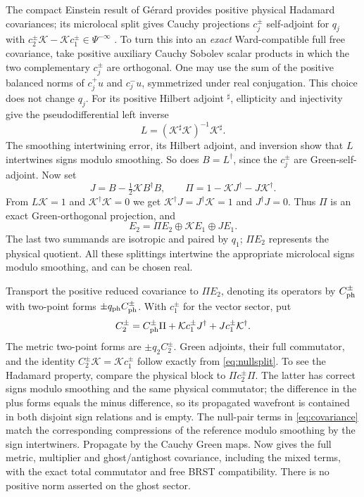 The compact Einstein result of G\'erard provides positive physical Hadamard covariances; its microlocal split gives Cauchy projections \(c_j^\pm\) self-adjoint for \(q_j\) with
\(
 c_2^\pm\mathcal K-\mathcal K c_1^\pm\in\Psi^{-\infty}
\)
\cite[Thm.~1.1, Lemma~3.2]{Gerard}. To turn this into an \emph{exact} Ward-compatible full free covariance, take positive auxiliary Cauchy Sobolev scalar products in which the two complementary \(c_j^\pm\) are orthogonal. One may use the sum of the positive balanced norms of \(c_j^+u\) and \(c_j^-u\), symmetrized under real conjugation. This choice does not change \(q_j\). For its positive Hilbert adjoint \(^{\sharp}\), ellipticity and injectivity give the pseudodifferential left inverse
\[
 L=(\mathcal K^\sharp\mathcal K)^{-1}\mathcal K^\sharp .
\]
The smoothing intertwining error, its Hilbert adjoint, and inversion show that \(L\) intertwines signs modulo smoothing. So does \(B=L^\dagger\), since the \(c_j^\pm\) are Green-self-adjoint. Now set
\begin{equation}
 J=B-\tfrac12\mathcal K B^\dagger B,\qquad
 \Pi=1-\mathcal K J^\dagger-J\mathcal K^\dagger .
 \label{eq:nullsplit}
\end{equation}
From \(L\mathcal K=1\) and \(\mathcal K^\dagger\mathcal K=0\) we get
\(\mathcal K^\dagger J=J^\dagger\mathcal K=1\) and \(J^\dagger J=0\). Thus \(\Pi\) is an exact Green-orthogonal projection, and
\[
     E_2=\Pi E_2\oplus\mathcal K E_1\oplus J E_1 .
\]
The last two summands are isotropic and paired by \(q_1\); \(\Pi E_2\) represents the physical quotient. All these splittings intertwine the appropriate microlocal signs modulo smoothing, and can be chosen real.

Transport the positive reduced covariance to \(\Pi E_2\), denoting its operators by \(C_{\rm ph}^\pm\) with two-point forms \(\pm q_{\rm ph}C_{\rm ph}^\pm\). With \(c_1^\pm\) for the vector sector, put
\begin{equation}
      C_2^\pm=C_{\rm ph}^\pm\Pi+
                \mathcal K c_1^\pm J^\dagger+
                J c_1^\pm\mathcal K^\dagger .
      \label{eq:covariance}
\end{equation}
The metric two-point forms are \(\pm q_2 C_2^\pm\). Green adjoints, their full commutator, and the identity \(C_2^\pm\mathcal K=\mathcal K c_1^\pm\) follow exactly from \eqref{eq:nullsplit}. To see the Hadamard property, compare the physical block to \(\Pi c_2^\pm\Pi\). The latter has correct signs modulo smoothing and the same physical commutator; the difference in the plus forms equals the minus difference, so its propagated wavefront is contained in both disjoint sign relations and is empty. The null-pair terms in \eqref{eq:covariance} match the corresponding compressions of the reference modulo smoothing by the sign intertwiners. Propagate by the Cauchy Green maps. Now \cite[Prop.~3.4, Eqs.~(3.27)--(3.28)]{WZ} gives the full metric, multiplier and ghost/antighost covariance, including the mixed terms, with the exact total commutator and free BRST compatibility. There is no positive norm asserted on the ghost sector.

